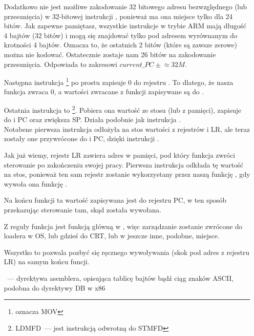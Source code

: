 Dodatkowo nie jest możliwe zakodowanie 32 bitowego adresu bezwzględnego (lub przesunięcia) w 32-bitowej instrukcji , ponieważ ma ona miejsce tylko dla 24 bitów.
Jak zapewne pamiętasz, wszystkie instrukcje w trybie ARM mają długość 4 bajtów (32 bitów) i mogą się znajdować tylko pod adresem wyrównanym do krotności 4 bajtów.
Oznacza to, że ostatnich 2 bitów (które są zawsze zerowe) można nie kodować.
Ostatecznie zostaje nam 26 bitów na zakodowanie przesunięcia. Odpowiada to zakresowi $current\_PC \pm{} \approx{}32M$.

Następna instrukcja \footnote{oznacza MOV}
po prostu zapisuje 0 do rejestru .
To dlatego, że nasza funkcja zwraca 0, a wartości zwracane z funkcji zapisywane są do .

Ostatnia instrukcja to \footnote{\ac{LDMFD}~--- jest instrukcją odwrotną do \ac{STMFD}}.
Pobiera ona wartość ze stosu (lub z pamięci), zapisuje do  i \ac{PC} oraz zwiększa  \ac{SP}. Działa podobnie jak instrukcja \POP.\\
Notabene pierwsza instrukcja  odłożyła na stos wartości z rejestrów  i \ac{LR}, ale teraz zostały one przywrócone do  i \ac{PC}, dzięki instrukcji .

Jak już wiemy, rejestr \ac{LR} zawiera adres w pamięci, pod który funkcja zwróci sterowanie po zakończeniu swojej pracy.
Pierwsza instrukcja odkłada tę wartość na stos, ponieważ ten sam rejestr zostanie wykorzystany przez naszą funkcję \main, gdy wywoła ona funkcję \printf.

Na końcu funkcji ta wartość zapisywana jest do rejestru \ac{PC}, w ten sposób przekazując sterowanie tam, skąd została wywołana.

Z reguły funkcja \main jest funkcją główną w \CCpp, więc zarządzanie zostanie zwrócone do loadera w \ac{OS}, lub gdzieś do \ac{CRT}, lub w jeszcze inne, podobne, miejsce.

Wszystko to pozwala pozbyć się ręcznego wywoływania  (skok pod adres z rejestru \ac{LR}) na samym końcu funcji.

~--- dyrektywa asemblera, opisująca tablicę bajtów bądź ciąg znaków ASCII, podobna do dyrektywy DB w x86


